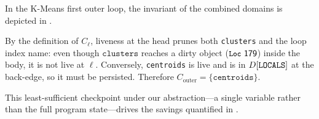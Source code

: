 \begin{example}
In the K-Means first outer loop, the invariant of the combined domains is depicted in .

By the definition of \(C_\ell\), liveness at the head prunes both \texttt{clusters} and the loop index name:
even though \(\texttt{clusters}\) reaches a dirty object (\(\textsf{\texttt{\small Loc}~{179}}\)) inside the body, it is not live at \(\ell\).
Conversely, \texttt{centroids} is live and is in \(D[\texttt{LOCALS}]\) at the back-edge, so it must be persisted.
Therefore \(C_{\text{outer}}=\{\texttt{centroids}\}\).
\end{example}

This least-sufficient checkpoint under our abstraction—a single variable rather than the full program state—drives the savings quantified in .
